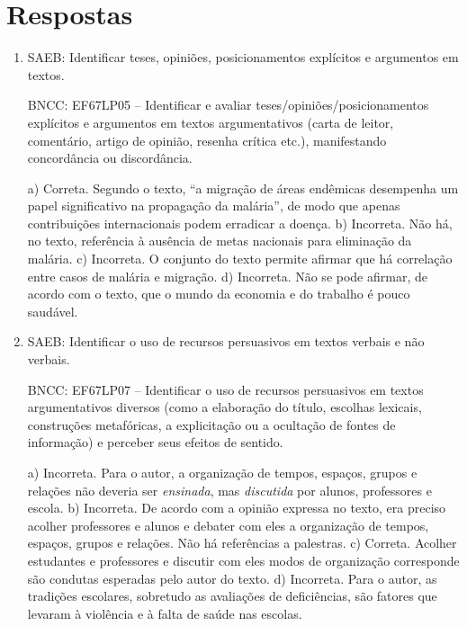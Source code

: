 \chapter{Respostas}
\pagestyle{plain}
\footnotesize

\pagecolor{gray!40}


\begin{enumerate}
\item
SAEB: Identificar teses, opiniões, posicionamentos explícitos e
argumentos em textos.

BNCC: EF67LP05 -- Identificar e avaliar teses/opiniões/posicionamentos explícitos 
e argumentos em textos argumentativos (carta de leitor, comentário, artigo de opinião,
resenha crítica etc.), manifestando concordância ou discordância.

a) Correta. Segundo o texto, ``a migração de áreas endêmicas desempenha um papel 
significativo na propagação da malária'', de modo que apenas contribuições internacionais
podem erradicar a doença.
b) Incorreta. Não há, no texto, referência à ausência de metas nacionais para eliminação 
da malária.
c) Incorreta. O conjunto do texto permite afirmar que há correlação entre casos de malária 
e migração. 
d) Incorreta. Não se pode afirmar, de acordo com o texto, que o mundo da economia e do trabalho
é pouco saudável.

\item
SAEB: Identificar o uso de recursos persuasivos em textos verbais e não
verbais.

BNCC: EF67LP07 -- Identificar o uso de recursos persuasivos em
textos argumentativos diversos (como a elaboração do título, escolhas
lexicais, construções metafóricas, a explicitação ou a ocultação de
fontes de informação) e perceber seus efeitos de sentido.

a) Incorreta. Para o autor, a organização de tempos, espaços, grupos e 
relações não deveria ser \textit{ensinada}, mas \textit{discutida}
por alunos, professores e escola.
b) Incorreta. De acordo com a opinião expressa no texto, era preciso acolher 
professores e alunos e debater com eles a organização de tempos, espaços, grupos e 
relações. Não há referências a palestras.
c) Correta. Acolher estudantes e professores e discutir com eles modos de organização
corresponde são condutas esperadas pelo autor do texto.
d) Incorreta. Para o autor, as tradições escolares, sobretudo as avaliações de deficiências,
são fatores que levaram à violência e à falta de saúde nas escolas.


\end{enumerate}
